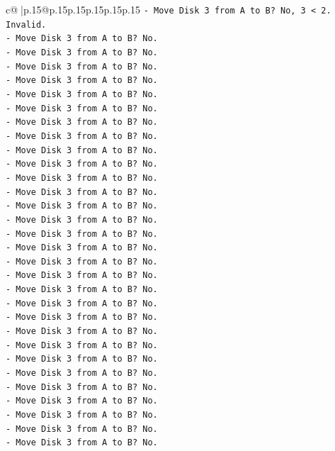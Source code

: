 \documentclass{article}
\begin{document}
{\begin{supertabular}{c@{$\;$}|p{.15\linewidth}@{}p{.15\linewidth}p{.15\linewidth}p{.15\linewidth}p{.15\linewidth}p{.15\linewidth}}
{{{\texttt{{-} Move Disk 3 from A to B? No, 3 < 2. Invalid.} \\
\texttt{{-} Move Disk 3 from A to B? No.} \\
\texttt{{-} Move Disk 3 from A to B? No.} \\
\texttt{{-} Move Disk 3 from A to B? No.} \\
\texttt{{-} Move Disk 3 from A to B? No.} \\
\texttt{{-} Move Disk 3 from A to B? No.} \\
\texttt{{-} Move Disk 3 from A to B? No.} \\
\texttt{{-} Move Disk 3 from A to B? No.} \\
\texttt{{-} Move Disk 3 from A to B? No.} \\
\texttt{{-} Move Disk 3 from A to B? No.} \\
\texttt{{-} Move Disk 3 from A to B? No.} \\
\texttt{{-} Move Disk 3 from A to B? No.} \\
\texttt{{-} Move Disk 3 from A to B? No.} \\
\texttt{{-} Move Disk 3 from A to B? No.} \\
\texttt{{-} Move Disk 3 from A to B? No.} \\
\texttt{{-} Move Disk 3 from A to B? No.} \\
\texttt{{-} Move Disk 3 from A to B? No.} \\
\texttt{{-} Move Disk 3 from A to B? No.} \\
\texttt{{-} Move Disk 3 from A to B? No.} \\
\texttt{{-} Move Disk 3 from A to B? No.} \\
\texttt{{-} Move Disk 3 from A to B? No.} \\
\texttt{{-} Move Disk 3 from A to B? No.} \\
\texttt{{-} Move Disk 3 from A to B? No.} \\
\texttt{{-} Move Disk 3 from A to B? No.} \\
\texttt{{-} Move Disk 3 from A to B? No.} \\
\texttt{{-} Move Disk 3 from A to B? No.} \\
\texttt{{-} Move Disk 3 from A to B? No.} \\
\texttt{{-} Move Disk 3 from A to B? No.} \\
\texttt{{-} Move Disk 3 from A to B? No.} \\
\texttt{{-} Move Disk 3 from A to B? No.} \\
\texttt{{-} Move Disk 3 from A to B? No.} \\
}}}
\end{supertabular}}
\end{document}

